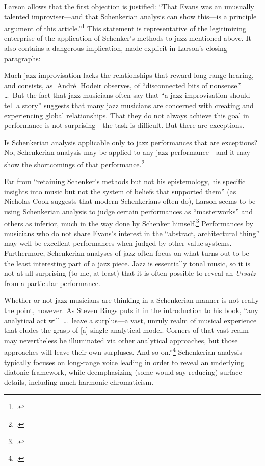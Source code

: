 \documentclass[diss]{subfiles}
\begin{document}
Larson allows that the first objection is justified: “That Evans was an
unusually talented improviser---and that Schenkerian analysis can show
this---is a principle argument of this article.”\footcite[239]{larson:1998}
This statement is representative of the legitimizing enterprise of the
application of Schenker’s methods to jazz mentioned above. It also contains a
dangerous implication, made explicit in Larson’s closing paragraphs:
\begin{quoting}
  \singlespacing
  Much jazz improvisation lacks the relationships that reward long-range
  hearing, and consists, as [André] Hodeir observes, of “disconnected bits of
  nonsense.” \ldots\ But the fact that jazz musicians often say that “a jazz
  improvisation should tell a story” suggests that many jazz musicians are
  concerned with creating and experiencing global relationships. That they do
  not always achieve this goal in performance is not surprising---the task is
  difficult. But there are exceptions.

  Is Schenkerian analysis applicable only to jazz performances that are
  exceptions? No, Schenkerian analysis may be applied to any jazz
  performance---and it may show the shortcomings of that
  performance.\footcite[240--41]{larson:1998}
\end{quoting}

Far from “retaining Schenker’s methods but not his epistemology, his specific
insights into music but not the system of beliefs that supported them” (as
Nicholas Cook suggests that modern Schenkerians often do), Larson seems to be
using Schenkerian analysis to judge certain performances as “masterworks” and
others as inferior, much in the way done by Schenker
himself.\footcite[439]{cook:1989} Performances by musicians who do not share
Evans’s interest in the “abstract, architectural thing” may well be excellent
performances when judged by other value systems.  Furthermore,
Schenkerian analyses of jazz often focus on what turns out to be the least
interesting part of a jazz piece. Jazz is essentially tonal music, so it is
not at all surprising (to me, at least) that it is often possible to reveal
an \emph{Ursatz} from a particular performance.

Whether or not jazz musicians are thinking in a Schenkerian manner is not
really the point, however. As Steven Rings puts it in the introduction to his
book, “any analytical act will~\ldots\ leave a surplus---a vast, unruly realm
of musical experience that eludes the grasp of [a] single analytical model.
Corners of that vast realm may nevertheless be illuminated via other
analytical approaches, but those approaches will leave their own surpluses.
And so on.”\footcite[5]{rings:2011} Schenkerian analysis typically focuses on
long-range voice leading in order to reveal an underlying diatonic framework,
while deemphasizing (some would say reducing) surface details, including much
harmonic chromaticism.
\end{document}
